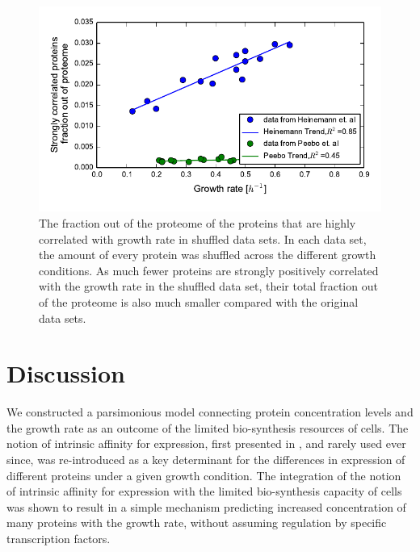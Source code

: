 \documentclass[a4paper]{article}
\begin{document}
\begin{figure}[H]
\begin{center}
\includegraphics[width=1\columnwidth]{shuffleGlobalClusterGRFit.pdf}
\caption{\label{fig:shuffledglobgrcorr}
The fraction out of the proteome of the proteins that are highly correlated with growth rate in shuffled data sets.
In each data set, the amount of every protein was shuffled across the different growth conditions.
As much fewer proteins are strongly positively correlated with the growth rate in the shuffled data set, their total fraction out of the proteome is also much smaller compared with the original data sets.
}
\end{center}
\end{figure}

\section{Discussion}
We constructed a parsimonious model connecting protein concentration levels and the growth rate as an outcome of the limited bio-synthesis resources of cells. 
The notion of intrinsic affinity for expression, first presented in \cite{Maaloe1969}, and rarely used ever since, was re-introduced as a key determinant for the differences in expression of different proteins under a given growth condition.
The integration of the notion of intrinsic affinity for expression with the limited bio-synthesis capacity of cells was shown to result in a simple mechanism predicting increased concentration of many proteins with the growth rate, without assuming regulation by specific transcription factors.
\end{document}

